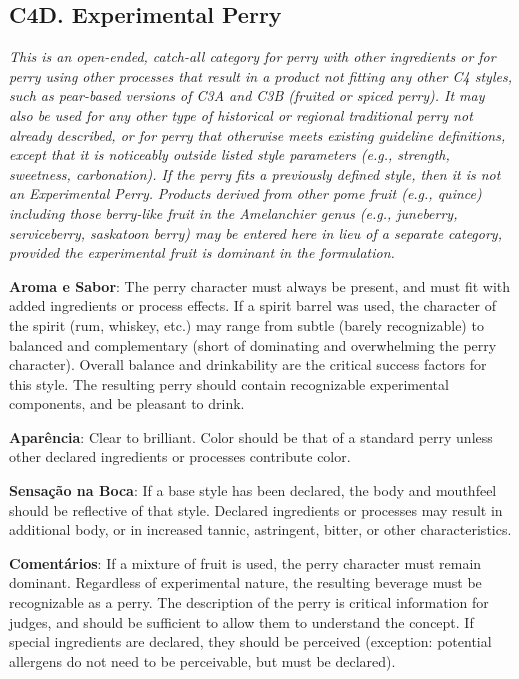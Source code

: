 \subsection*{C4D. Experimental Perry}

\textit{This is an open-ended, catch-all category for perry with other ingredients or for perry using other processes that result in a product not fitting any other C4 styles, such as pear-based versions of C3A and C3B (fruited or spiced perry). It may also be used for any other type of historical or regional traditional perry not already described, or for perry that otherwise meets existing guideline definitions, except that it is noticeably outside listed style parameters (e.g., strength, sweetness, carbonation). If the perry fits a previously defined style, then it is not an Experimental Perry.}
\textit{Products derived from other pome fruit (e.g., quince) including those berry-like fruit in the Amelanchier genus (e.g., juneberry, serviceberry, saskatoon berry) may be entered here in lieu of a separate category, provided the experimental fruit is dominant in the formulation.}

\textbf{Aroma e Sabor}: The perry character must always be present, and must fit with added ingredients or process effects. If a spirit barrel was used, the character of the spirit (rum, whiskey, etc.) may range from subtle (barely recognizable) to balanced and complementary (short of dominating and overwhelming the perry character). Overall balance and drinkability are the critical success factors for this style. The resulting perry should contain recognizable experimental components, and be pleasant to drink.

\textbf{Aparência}: Clear to brilliant. Color should be that of a standard perry unless other declared ingredients or processes contribute color.

\textbf{Sensação na Boca}: If a base style has been declared, the body and mouthfeel should be reflective of that style. Declared ingredients or processes may result in additional body, or in increased tannic, astringent, bitter, or other characteristics.

\textbf{Comentários}: If a mixture of fruit is used, the perry character must remain dominant. Regardless of experimental nature, the resulting beverage must be recognizable as a perry. The description of the perry is critical information for judges, and should be sufficient to allow them to understand the concept. If special ingredients are declared, they should be perceived (exception: potential allergens do not need to be perceivable, but must be declared).

